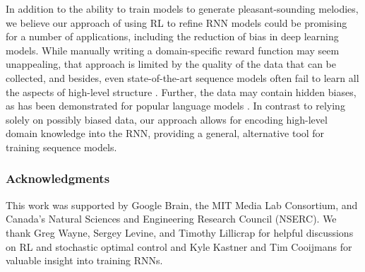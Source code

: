 In addition to the ability to train models to generate pleasant-sounding melodies, we believe our approach of using RL to refine RNN models could be promising for a number of applications, including the reduction of bias in deep learning models. While manually writing a domain-specific reward function may seem unappealing, that approach is limited by the quality of the data that can be collected, and besides, even state-of-the-art sequence models often fail to learn all the aspects of high-level structure \citep{wavenet,graves}. Further, the data may contain hidden biases, as has been demonstrated for popular language models \citep{caliskan2016semantics}. In contrast to relying solely on possibly biased data, our approach allows for encoding high-level domain knowledge into the RNN, providing a general, alternative tool for training sequence models.

\subsubsection*{Acknowledgments}

This work was supported by Google Brain, the MIT Media Lab Consortium, and Canada's Natural Sciences and Engineering Research Council (NSERC). We thank Greg Wayne, Sergey Levine, and Timothy Lillicrap for helpful discussions on RL and stochastic optimal control and Kyle Kastner and Tim Cooijmans for valuable insight into training RNNs.


